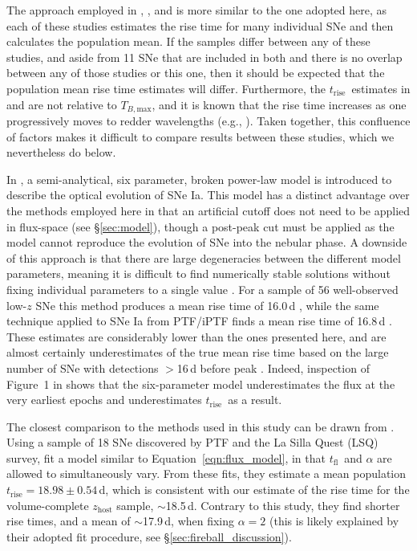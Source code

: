 \documentclass[twocolumn]{aastex63}
\newcommand{\tfl}{$t_\mathrm{fl}$}
\newcommand{\trise}{$t_\mathrm{rise}$}
\newcommand{\tbmax}{$T_{B,\mathrm{max}}$}
\begin{document}
The approach employed in \citet{Zheng17a}, \citet{Papadogiannakis19}, and
\citet{Firth15} is more similar to the one adopted here, as each of these
studies estimates the rise time for many individual SNe and then calculates
the population mean. If the samples differ between any of these studies, and
aside from 11 SNe that are included in both \citet{Papadogiannakis19} and
\citet{Firth15} there is no overlap between any of those studies or this one,
then it should be expected that the population mean rise time estimates will
differ. Furthermore, the \trise\ estimates in \citet{Papadogiannakis19} and
\citet{Firth15} are not relative to \tbmax, and it is known that the rise time
increases as one progressively moves to redder wavelengths (e.g.,
\citealt{Ganeshalingam11}). Taken together, this confluence of factors makes
it difficult to compare results between these studies, which we nevertheless
do below.

In \citet{Zheng17}, a semi-analytical, six parameter, broken power-law model
is introduced to describe the optical evolution of SNe Ia. This model has a
distinct advantage over the methods employed here in that an artificial cutoff
does not need to be applied in flux-space (see \S\ref{sec:model}), though a
post-peak cut must be applied as the model cannot reproduce the evolution of
SNe into the nebular phase. A downside of this approach is that there are
large degeneracies between the different model parameters, meaning it is
difficult to find numerically stable solutions without fixing individual
parameters to a single value \citep{Zheng17a}. For a sample of 56
well-observed low-$z$ SNe this method produces a mean rise time of 16.0\,d
\citep{Zheng17a}, while the same technique applied to SNe Ia from PTF/iPTF
finds a mean rise time of 16.8\,d \citep{Papadogiannakis19}. These estimates
are considerably lower than the ones presented here, and are almost certainly
underestimates of the true mean rise time based on the large number of SNe
with detections $>$16\,d before peak \citep{Papadogiannakis19, Yao19}. Indeed,
inspection of Figure~1 in \citet{Zheng17a} shows that the six-parameter model
underestimates the flux at the very earliest epochs and underestimates \trise\
as a result.

The closest comparison to the methods used in this study can be drawn from
\citet{Firth15}. Using a sample of 18 SNe discovered by PTF and the La Silla
Quest (LSQ) survey, \citeauthor{Firth15} fit a model similar to
Equation~\ref{eqn:flux_model}, in that \tfl\ and $\alpha$ are allowed to
simultaneously vary. From these fits, they estimate a mean population \trise$
= 18.98 \pm 0.54$\,d, which is consistent with our estimate of the rise time
for the volume-complete $z_\mathrm{host}$ sample, $\sim$18.5\,d. Contrary to
this study, they find shorter rise times, and a mean of $\sim$17.9\,d, when
fixing $\alpha = 2$ (this is likely explained by their adopted fit procedure,
see \S\ref{sec:fireball_discussion}).
\end{document}
